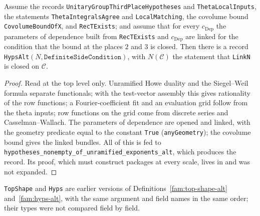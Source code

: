 \begin{proposition}\label{fam:nonempty-hyps}
Assume the records \texttt{UnitaryGroupThirdPlaceHypotheses} and \texttt{ThetaLocalInputs}, the statements \texttt{ThetaIntegralsAgree} and \texttt{LocalMatching}, the covolume bound \texttt{CovolumeBoundOfX}, and \texttt{RecTExists}; and assume that for every $c_{\mathrm{Dep}}$ the parameters of dependence built from \texttt{RecTExists} and $c_{\mathrm{Dep}}$ are linked for the condition that the bound at the places $2$ and $3$ is closed. Then there is a record \texttt{HypsAlt}$(N,\texttt{DefiniteSideCondition})$, with $N(\mathcal C)$ the statement that \texttt{LinkN} is closed on $\mathcal C$.
\end{proposition}
\begin{proof}
Read at the top level only. Unramified Howe duality and the Siegel--Weil formula separate functionals; with the test-vector assembly this gives rationality of the row functions; a Fourier-coefficient fit and an evaluation grid follow from the theta inputs; row functions on the grid come from discrete series and Casselman--Wallach. The parameters of dependence are opened and linked, with the geometry predicate equal to the constant \texttt{True} (\texttt{anyGeometry}); the covolume bound gives the linked bundles. All of this is fed to \texttt{hypotheses\_nonempty\_of\_unramified\_exponents\_alt}, which produces the record. Its proof, which must construct packages at every scale, lives in  and was not expanded.
\end{proof}



\begin{definition}\label{fam:top-shape-old}
\texttt{TopShape} and \texttt{Hyps} are earlier versions of Definitions~\ref{fam:top-shape-alt} and~\ref{fam:hyps-alt}, with the same argument and field names in the same order; their types were not compared field by field.
\end{definition}

